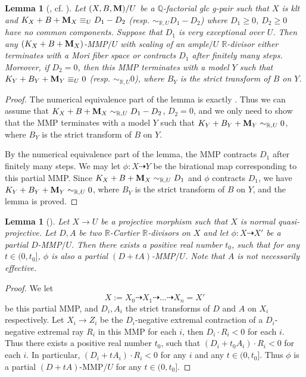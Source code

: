 \documentclass[11pt]{amsart}
\numberwithin{equation}{section}
\newcommand{\Mm}{{\bf{M}}}
\newcommand{\Qq}{\mathbb{Q}}
\newcommand{\Rr}{\mathbb{R}}
\newtheorem{lem}[thm]{Lemma}
\theoremstyle{definition}
\theoremstyle{definition}
\theoremstyle{definition}
\begin{document}
\begin{lem}[{\cite[Version 3, Lemma 2.20]{HL21}, cf. \cite[Proposition 3.8]{HL18}}]\label{lem: rlinear version of hl18 3.8}
Let $(X,B,\Mm)/U$ be a $\Qq$-factorial glc g-pair such that $X$ is klt and $K_X+B+\Mm_X\equiv_{U}D_1-D_2$ (resp.  $\sim_{\mathbb R,U}D_1-D_2$) where $D_1\geq 0$, $D_2\geq 0$ have no common components. Suppose that $D_1$ is very exceptional over $U$. Then any $(K_X+B+\Mm_X)$-MMP$/U$ with scaling of an ample$/U$ $\Rr$-divisor either terminates with a Mori fiber space or contracts $D_1$ after finitely many steps. Moreover, if $D_2=0$, then this MMP terminates with a model $Y$ such that  $K_Y+B_Y+\Mm_Y\equiv_{U}0$ (resp. $\sim_{\mathbb R,U}0$), where $B_Y$ is the strict transform of $B$ on $Y$. 
\end{lem}
\begin{proof}
The numerical equivalence part of the lemma is exactly \cite[Proposition 3.8]{HL18}. Thus we can assume that $K_X+B+\Mm_X\sim_{\mathbb R,U}D_1-D_2$, $D_2=0$, and we only need to show that the MMP terminates with a model $Y$ such that $K_Y+B_Y+\Mm_Y\sim_{\mathbb R,U}0$, where $B_Y$ is the strict transform of $B$ on $Y$.

By the numerical equivalence part of the lemma, the MMP contracts $D_1$ after finitely many steps. We may let $\phi: X\dashrightarrow Y$ be the birational map corresponding to this partial MMP. Since $K_X+B+\Mm_X\sim_{\mathbb R,U}D_1$ and $\phi$ contracts $D_1$, we have $K_Y+B_Y+\Mm_Y\sim_{\mathbb R,U}0$, where $B_Y$ is the strict transform of $B$ on $Y$, and the lemma is proved.
\end{proof}

\begin{lem}[{\cite[Version 3, Lemma 2.25]{HL21}}]\label{lem: still an mmp under perturbation}
Let $X\rightarrow U$ be a projective morphism such that $X$ is normal quasi-projective. Let $D,A$ be two $\Rr$-Cartier $\Rr$-divisors on $X$ and let $\phi: X\dashrightarrow X'$ be a partial $D$-MMP$/U$. Then there exists a positive real number $t_0$, such that for any $t\in (0,t_0]$, $\phi$ is also a partial $(D+tA)$-MMP$/U$. Note that $A$ is not necessarily effective.
\end{lem}
\begin{proof}
We let
$$X:=X_0\dashrightarrow X_1\dashrightarrow\dots\dashrightarrow X_n=X'$$
be this partial MMP, and $D_i,A_i$ the strict transforms of $D$ and $A$ on $X_i$ respectively. Let $X_i\rightarrow Z_i$ be the $D_i$-negative extremal contraction of a $D_i$-negative extremal ray $R_i$ in this MMP for each $i$, then $D_i\cdot R_i<0$ for each $i$. Thus there exists a positive real number $t_0$, such that $(D_i+t_0A_i)\cdot R_i<0$ for each $i$. In particular, $(D_i+tA_i)\cdot R_i<0$ for any $i$ and any $t\in (0,t_0]$. Thus $\phi$ is a partial $(D+tA)$-MMP$/U$ for any $t\in (0,t_0]$.
\end{proof}
\end{document}
